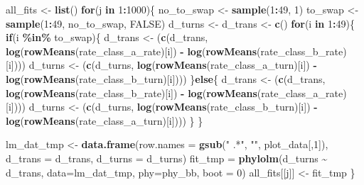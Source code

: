 \documentclass[
]{article}
\newenvironment{Shaded}{\begin{snugshade}}{\end{snugshade}}
\newcommand{\AttributeTok}[1]{\textcolor[rgb]{0.13,0.29,0.53}{#1}}
\newcommand{\ConstantTok}[1]{\textcolor[rgb]{0.56,0.35,0.01}{#1}}
\newcommand{\ControlFlowTok}[1]{\textcolor[rgb]{0.13,0.29,0.53}{\textbf{#1}}}
\newcommand{\DecValTok}[1]{\textcolor[rgb]{0.00,0.00,0.81}{#1}}
\newcommand{\FunctionTok}[1]{\textcolor[rgb]{0.13,0.29,0.53}{\textbf{#1}}}
\newcommand{\NormalTok}[1]{#1}
\newcommand{\OtherTok}[1]{\textcolor[rgb]{0.56,0.35,0.01}{#1}}
\newcommand{\SpecialCharTok}[1]{\textcolor[rgb]{0.81,0.36,0.00}{\textbf{#1}}}
\newcommand{\StringTok}[1]{\textcolor[rgb]{0.31,0.60,0.02}{#1}}
\begin{document}
\begin{Shaded}
\begin{Highlighting}[]
\NormalTok{all\_fits }\OtherTok{\textless{}{-}} \FunctionTok{list}\NormalTok{()}
\ControlFlowTok{for}\NormalTok{(j }\ControlFlowTok{in} \DecValTok{1}\SpecialCharTok{:}\DecValTok{1000}\NormalTok{)\{}
\NormalTok{  no\_to\_swap }\OtherTok{\textless{}{-}} \FunctionTok{sample}\NormalTok{(}\DecValTok{1}\SpecialCharTok{:}\DecValTok{49}\NormalTok{, }\DecValTok{1}\NormalTok{)}
\NormalTok{  to\_swap }\OtherTok{\textless{}{-}} \FunctionTok{sample}\NormalTok{(}\DecValTok{1}\SpecialCharTok{:}\DecValTok{49}\NormalTok{, no\_to\_swap, }\ConstantTok{FALSE}\NormalTok{)}
\NormalTok{  d\_turns }\OtherTok{\textless{}{-}}\NormalTok{ d\_trans }\OtherTok{\textless{}{-}} \FunctionTok{c}\NormalTok{()}
  \ControlFlowTok{for}\NormalTok{(i }\ControlFlowTok{in} \DecValTok{1}\SpecialCharTok{:}\DecValTok{49}\NormalTok{)\{}
    \ControlFlowTok{if}\NormalTok{(i }\SpecialCharTok{\%in\%}\NormalTok{ to\_swap)\{}
\NormalTok{      d\_trans }\OtherTok{\textless{}{-}}\NormalTok{ (}\FunctionTok{c}\NormalTok{(d\_trans, }\FunctionTok{log}\NormalTok{(}\FunctionTok{rowMeans}\NormalTok{(rate\_class\_a\_rate)[i]) }\SpecialCharTok{{-}} 
                      \FunctionTok{log}\NormalTok{(}\FunctionTok{rowMeans}\NormalTok{(rate\_class\_b\_rate)[i])))}
\NormalTok{      d\_turns }\OtherTok{\textless{}{-}}\NormalTok{ (}\FunctionTok{c}\NormalTok{(d\_turns, }\FunctionTok{log}\NormalTok{(}\FunctionTok{rowMeans}\NormalTok{(rate\_class\_a\_turn)[i]) }\SpecialCharTok{{-}} 
                      \FunctionTok{log}\NormalTok{(}\FunctionTok{rowMeans}\NormalTok{(rate\_class\_b\_turn)[i])))}
\NormalTok{    \}}\ControlFlowTok{else}\NormalTok{\{}
\NormalTok{      d\_trans }\OtherTok{\textless{}{-}}\NormalTok{ (}\FunctionTok{c}\NormalTok{(d\_trans, }\FunctionTok{log}\NormalTok{(}\FunctionTok{rowMeans}\NormalTok{(rate\_class\_b\_rate)[i]) }\SpecialCharTok{{-}} 
                      \FunctionTok{log}\NormalTok{(}\FunctionTok{rowMeans}\NormalTok{(rate\_class\_a\_rate)[i])))}
\NormalTok{      d\_turns }\OtherTok{\textless{}{-}}\NormalTok{ (}\FunctionTok{c}\NormalTok{(d\_turns, }\FunctionTok{log}\NormalTok{(}\FunctionTok{rowMeans}\NormalTok{(rate\_class\_b\_turn)[i]) }\SpecialCharTok{{-}} 
                      \FunctionTok{log}\NormalTok{(}\FunctionTok{rowMeans}\NormalTok{(rate\_class\_a\_turn)[i])))}
\NormalTok{    \}}
\NormalTok{  \}}
  
\NormalTok{  lm\_dat\_tmp }\OtherTok{\textless{}{-}} \FunctionTok{data.frame}\NormalTok{(}\AttributeTok{row.names =} \FunctionTok{gsub}\NormalTok{(}\StringTok{" .*"}\NormalTok{, }\StringTok{""}\NormalTok{, plot\_data[,}\DecValTok{1}\NormalTok{]),}
                       \AttributeTok{d\_trans =}\NormalTok{ d\_trans,}
                       \AttributeTok{d\_turns =}\NormalTok{ d\_turns)}
\NormalTok{  fit\_tmp }\OtherTok{=} \FunctionTok{phylolm}\NormalTok{(d\_turns }\SpecialCharTok{\textasciitilde{}}\NormalTok{ d\_trans, }\AttributeTok{data=}\NormalTok{lm\_dat\_tmp, }\AttributeTok{phy=}\NormalTok{phy\_bb, }\AttributeTok{boot =} \DecValTok{0}\NormalTok{)}
\NormalTok{  all\_fits[[j]] }\OtherTok{\textless{}{-}}\NormalTok{ fit\_tmp}
\NormalTok{\}}
\end{Highlighting}
\end{Shaded}
\end{document}
